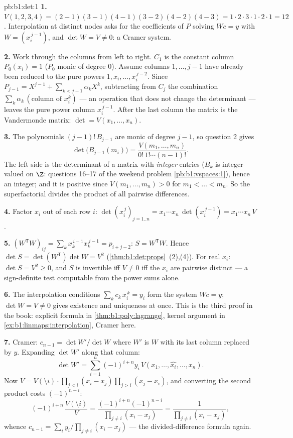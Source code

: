 \begin{solution}{pb:b1:det:1}
\textbf{1.} $V(1,2,3,4) = (2-1)(3-1)(4-1)(3-2)(4-2)(4-3) = 1
\cdot 2\cdot 3\cdot 1\cdot 2\cdot 1 = 12$. Interpolation at
distinct nodes asks for the coefficients of $P$ solving $W c =
y$ with $W = (x_i^{\,j-1})$, and $\det W = V \neq 0$: a Cramer
system.

\textbf{2.} Work through the columns from left to right. $C_1$
is the constant column $P_0(x_i) = 1$ ($P_0$ monic of degree
$0$). Assume columns $1, \dots, j-1$ have already been reduced
to the pure powers $1, x_i, \dots, x_i^{\,j-2}$. Since $P_{j-1}
= X^{j-1} + \sum_{k < j-1}\alpha_k X^k$, subtracting from $C_j$
the combination $\sum_k \alpha_k\,(\text{column of } x_i^k)$
--- an operation that does not change the determinant --- leaves
the pure power column $x_i^{\,j-1}$. After the last column the
matrix is the Vandermonde matrix: $\det = V(x_1, \dots, x_n)$.

\textbf{3.} The polynomials $(j-1)!\,B_{j-1}$ are monic of
degree $j - 1$, so question 2 gives
\[
\det\bigl(B_{j-1}(m_i)\bigr)
= \frac{V(m_1, \dots, m_n)}{0!\,1!\cdots(n-1)!} .
\]
The left side is the determinant of a matrix with \emph{integer}
entries ($B_k$ is integer-valued on $\Z$: questions 16--17 of
the weekend problem \cref{pb:b1:vspaces:1}), hence an integer;
and it is positive since $V(m_1, \dots, m_n) > 0$ for $m_1 <
\dots < m_n$. So the superfactorial divides the product of all
pairwise differences.

\textbf{4.} Factor $x_i$ out of each row $i$:
$\det(x_i^{\,j})_{j = 1..n} = x_1\cdots x_n\,
\det(x_i^{\,j-1}) = x_1\cdots x_n\,V$.

\textbf{5.} $(W^{\mathsf T}W)_{ij} = \sum_k x_k^{\,i-1}
x_k^{\,j-1} = p_{i+j-2}$: $S = W^{\mathsf T}W$. Hence $\det S =
\det(W^{\mathsf T})\det W = V^2$
(\cref{thm:b1:det:props}~(2),(4)). For real $x_i$: $\det S = V^2
\geq 0$, and $S$ is invertible iff $V \neq 0$ iff the $x_i$ are
pairwise distinct --- a sign-definite test computable from the
power sums alone.

\textbf{6.} The interpolation conditions $\sum_{k}
c_k\,x_i^{\,k} = y_i$ form the system $Wc = y$; $\det W = V \neq
0$ gives existence and uniqueness at once. This is the third
proof in the book: explicit formula in
\cref{thm:b1:poly:lagrange}, kernel argument in
\cref{ex:b1:linmaps:interpolation}, Cramer here.

\textbf{7.} Cramer: $c_{n-1} = \det W'/\det W$ where $W'$ is $W$
with its last column replaced by $y$. Expanding $\det W'$ along
that column:
\[
\det W' = \sum_{i=1}^n (-1)^{i+n} y_i\,V(x_1, \dots, \widehat{x_i},
\dots, x_n) .
\]
Now $V = V(\setminus i)\cdot\prod_{j<i}(x_i - x_j)\prod_{j>i}
(x_j - x_i)$, and converting the second product costs
$(-1)^{n-i}$:
\[
(-1)^{i+n}\,\frac{V(\setminus i)}{V}
= \frac{(-1)^{i+n}(-1)^{n-i}}{\prod_{j\neq i}(x_i - x_j)}
= \frac{1}{\prod_{j\neq i}(x_i - x_j)} ,
\]
whence $c_{n-1} = \sum_i y_i/\prod_{j \neq i}(x_i - x_j)$ ---
the divided-difference formula again.


\end{solution}
